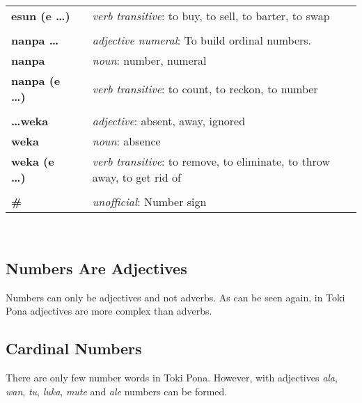 \begin{supertabular}{p{2,5cm}|ll}
\textbf{esun (e \dots)} && \textit{verb transitive}: to buy, to sell, to barter, to swap \\ %
 && \\ %
%
\textbf{nanpa \dots} && \textit{adjective numeral}: To build ordinal numbers. \\ %
\textbf{nanpa} && \textit{noun}: number, numeral \\ %
\textbf{nanpa (e \dots)} && \textit{verb transitive}: to count, to reckon,  to number \\ %
 && \\ %
%
\textbf{\dots weka} && \textit{adjective}: absent, away, ignored \\ %
\textbf{weka} && \textit{noun}: absence \\ %
\textbf{weka (e \dots)} && \textit{verb transitive}: to remove, to eliminate, to throw away, to get rid of \\ %
 && \\ %
%
\index{\#}
\textbf{\#} && \textit{unofficial}: Number sign  \\ %
%
\end{supertabular} \\
%
%
%
\newpage
%
\subsection*{Numbers Are Adjectives}
%
%
Numbers can only be adjectives and not adverbs. 
As can be seen again, in Toki Pona adjectives are more complex than adverbs. 
%

\subsection*{Cardinal Numbers}
%
There are only few number words in Toki Pona.
However, with adjectives \textit{ala}, \textit{wan}, \textit{tu}, \textit{luka}, \textit{mute} and \textit{ale} numbers can be formed.

